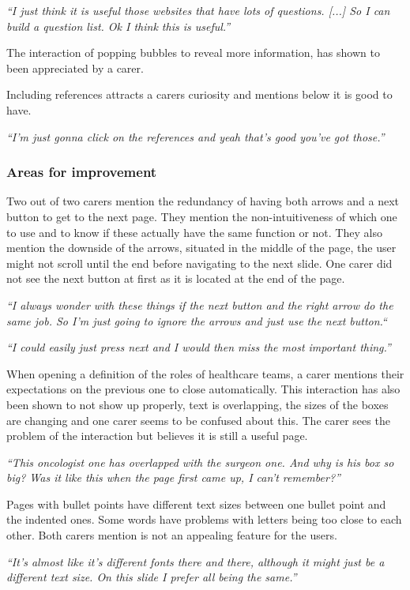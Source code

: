 \documentclass{sigchi}
\begin{document}
\textit{“I just think it is useful those websites that have lots of questions. [...] So I can build a question list. Ok I think this is useful.”} 

The interaction of popping bubbles to reveal more information, has shown to been appreciated by a carer.

Including references attracts a carers curiosity and mentions below it is good to have.

\textit{“I’m just gonna click on the references and yeah that’s good you’ve got those.”}

\subsubsection{Areas for improvement}
Two out of two carers mention the redundancy of having both arrows and a next button to get to the next page. They mention the non-intuitiveness of which one to use and to know if these actually have the same function or not. They also mention the downside of the arrows, situated in the middle of the page, the user might not scroll until the end before navigating to the next slide. One carer did not see the next button at first as it is located at the end of the page.

\textit{“I always wonder with these things if the next button and the right arrow do the same job. So I’m just going to ignore the arrows and just use the next button.“}

\textit{“I could easily just press next and I would then miss the most important thing.”}

When opening a definition of the roles of healthcare teams, a carer mentions their expectations on the previous one to close automatically. This interaction has also been shown to not show up properly, text is overlapping, the sizes of the boxes are changing and one carer seems to be confused about this. The carer sees the problem of the interaction but believes it is still a useful page.

\textit{“This oncologist one has overlapped with the surgeon one. And why is his box so big? Was it like this when the page first came up, I can’t remember?”}

Pages with bullet points have different text sizes between one bullet point and the indented ones. Some words have problems with letters being too close to each other. Both carers mention is not an appealing feature for the users.

\textit{“It’s almost like it’s different fonts there and there, although it might just be a different text size. On this slide I prefer all being the same.”}
\end{document}
